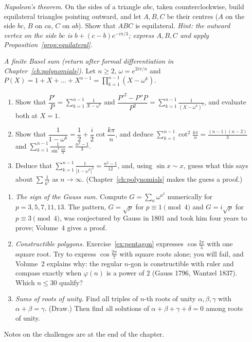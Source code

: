 \begin{exercise}[$\star\star\star$]\label{ex:napoleon}
\emph{Napoleon's theorem.} On the sides of a triangle $abc$, taken counterclockwise, build equilateral triangles pointing outward, and let $A,B,C$ be their
centres ($A$ on the side $bc$, $B$ on $ca$, $C$ on $ab$). Show that $ABC$ is equilateral. \emph{Hint: the outward vertex on the side $bc$ is $b+(c-b)e^{-i\pi/3}$; express $A,B,C$ and apply Proposition~\ref{prop:equilateral}.}
\end{exercise}

\begin{exercise}[$\star\star\star$]\label{ex:cotsum}
\emph{A finite Basel sum (return after formal differentiation in Chapter~\ref{ch:polynomials}).} Let $n\ge2$, $\omega=e^{2i\pi/n}$ and $P(X)=1+X+\dots+X^{n-1}=\prod_{k=1}^{n-1}(X-\omega^k)$.
\begin{enumerate}[label=(\alph*)]
\item Show that $\dfrac{P'}{P}=\displaystyle\sum_{k=1}^{n-1}\frac1{X-\omega^k}$ and $\dfrac{P'^2-P''P}{P^2}=\displaystyle\sum_{k=1}^{n-1}\frac1{(X-\omega^k)^2}$, and evaluate both at $X=1$.
\item Show that $\dfrac1{1-\omega^k}=\dfrac12+\dfrac i2\cot\dfrac{k\pi}n$, and deduce $\displaystyle\sum_{k=1}^{n-1}\cot^2\frac{k\pi}n=\frac{(n-1)(n-2)}3$ and $\displaystyle\sum_{k=1}^{n-1}\frac1{\sin^2\frac{k\pi}n}=\frac{n^2-1}3$.
\item Deduce that $\displaystyle\sum_{k=1}^{n-1}\frac1{|1-\omega^k|^2}=\frac{n^2-1}{12}$, and, using $\sin x\sim x$, guess what this says about $\sum\frac1{k^2}$ as $n\to\infty$. (Chapter~\ref{ch:polynomials} makes the guess a proof.)
\end{enumerate}
\end{exercise}

\begin{challenge}
\begin{enumerate}[label=(\arabic*)]
\item \emph{The sign of the Gauss sum.} Compute $G=\sum_a\omega^{a^2}$ numerically for $p=3,5,7,11,13$. The pattern, $G=\sqrt p$ for $p\equiv1\pmod4$ and $G=i\sqrt p$ for $p\equiv3\pmod4$, was conjectured by Gauss in 1801 and took him four years to prove; Volume~4 gives a proof.
\item \emph{Constructible polygons.} Exercise~\ref{ex:pentagon} expresses $\cos\frac{2\pi}5$ with one square root. Try to express $\cos\frac{2\pi}7$ with square roots alone; you will fail, and Volume~2 explains why: the regular $n$-gon is constructible with ruler and compass exactly when $\varphi(n)$ is a power of $2$ (Gauss 1796, Wantzel 1837). Which $n\le30$ qualify?
\item \emph{Sums of roots of unity.} Find all triples of $n$-th roots of unity $\alpha,\beta,\gamma$ with $\alpha+\beta=\gamma$. (Draw.) Then find all solutions of $\alpha+\beta+\gamma+\delta=0$ among roots of unity.
\end{enumerate}
Notes on the challenges are at the end of the chapter.
\end{challenge}

